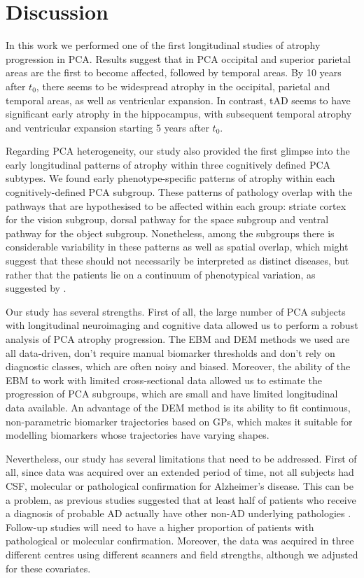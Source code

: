 \section{Discussion}
\label{sec:pcaDis}

In this work we performed one of the first longitudinal studies of atrophy progression in PCA. Results suggest that in PCA occipital and superior parietal areas are the first to become affected, followed by temporal areas. By 10 years after $t_0$, there seems to be widespread atrophy in the occipital, parietal and temporal areas, as well as ventricular expansion. In contrast, tAD seems to have significant early atrophy in the hippocampus, with subsequent temporal atrophy and ventricular expansion starting 5 years after $t_0$. 

Regarding PCA heterogeneity, our study also provided the first glimpse into the early longitudinal patterns of atrophy within three cognitively defined PCA subtypes. We found early phenotype-specific patterns of atrophy within each cognitively-defined PCA subgroup. These patterns of pathology overlap with the pathways that are hypothesised to be affected within each group: striate cortex for the vision subgroup, dorsal pathway for the space subgroup and ventral pathway for the object subgroup. Nonetheless, among the subgroups there is considerable variability in these patterns as well as spatial overlap, which might suggest that these should not necessarily be interpreted as distinct diseases, but rather that the patients lie on a continuum of phenotypical variation, as suggested by \cite{lehmann2011basic}. 

Our study has several strengths. First of all, the large number of PCA subjects with longitudinal neuroimaging and cognitive data allowed us to perform a robust analysis of PCA atrophy progression. The EBM and DEM methods we used are all data-driven, don't require manual biomarker thresholds and don't rely on diagnostic classes, which are often noisy and biased. Moreover, the ability of the EBM to work with limited cross-sectional data allowed us to estimate the progression of PCA subgroups, which are small and have limited longitudinal data available.  An advantage of the DEM method is its ability to fit continuous, non-parametric biomarker trajectories based on GPs, which makes it suitable for modelling biomarkers whose trajectories have varying shapes.

Nevertheless, our study has several limitations that need to be addressed. First of all, since data was acquired over an extended period of time, not all subjects had CSF, molecular or pathological confirmation for Alzheimer's disease. This can be a problem, as previous studies suggested that at least half of patients who receive a  diagnosis of probable AD actually have other non-AD underlying pathologies \cite{schneider2007mixed,schneider2009neuropathology}. Follow-up studies will need to have a higher proportion of patients with pathological or molecular confirmation. Moreover, the data was acquired in three different centres using different scanners and field strengths, although we adjusted for these covariates. 


